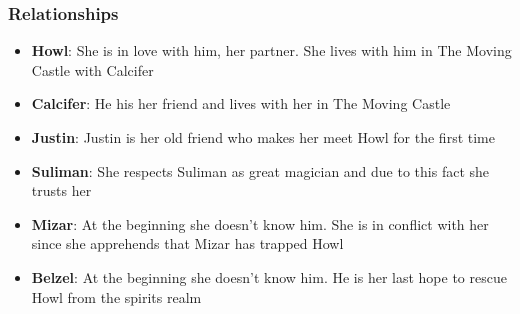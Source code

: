 




\subsubsection*{Relationships}
\begin{itemize}
\item \textbf{Howl}: She is in love with him, her partner. She lives with him in The Moving Castle with Calcifer
\item \textbf{Calcifer}: He his her friend and lives with her in The Moving Castle
\item \textbf{Justin}: Justin is her old friend who makes her meet Howl for the first time
\item \textbf{Suliman}: She respects Suliman as great magician and due to this fact she trusts her
\item \textbf{Mizar}: At the beginning she doesn’t know him. She is in conflict with her since she 
apprehends that Mizar has trapped Howl
\item \textbf{Belzel}: At the beginning she doesn’t know him. He is her last hope to rescue Howl from the spirits realm
\end{itemize}

